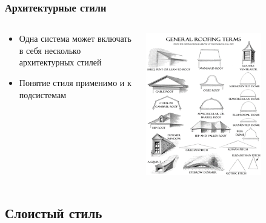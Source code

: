 \documentclass{../../slides-style}
\begin{document}
    \begin{frame}
        \frametitle{Архитектурные стили}
        \begin{columns}
            \begin{column}{0.5\textwidth}
                \begin{itemize}
                    \item Одна система может включать в себя несколько архитектурных стилей
                    \item Понятие стиля применимо и к подсистемам
                \end{itemize}
            \end{column}
            \begin{column}{0.5\textwidth}
                \begin{center}
                    \includegraphics[width=0.7\textwidth]{roofStyles.png}
                \end{center}
            \end{column}
        \end{columns}
    \end{frame}

    \subsection{Слоистый стиль}
\end{document}
